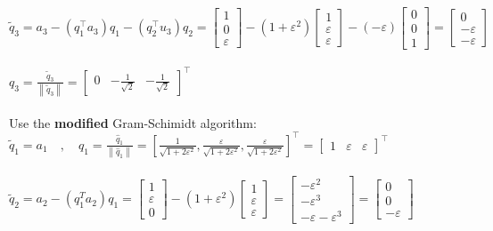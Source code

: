 \documentclass[english,onecolumn]{IEEEtran}
\begin{document}
\begin{enumerate}
\\$\tilde{q}_{3}=a_{3}-\left(q_{1}^{\top} a_{3}\right) q_{1}-\left(q_{2}^{\top} u_{3}\right) q_{2}=\left[\begin{array}{c}1 \\ 0 \\ \varepsilon\end{array}\right]-\left(1+\varepsilon^{2}\right)\left[\begin{array}{c}1 \\ \varepsilon \\ \varepsilon\end{array}\right]-(-\varepsilon)\left[\begin{array}{c}0 \\ 0 \\ 1\end{array}\right]=\left[\begin{array}{c}0 \\ -\varepsilon \\ -\varepsilon\end{array}\right]$
\\ \\$q_{3}=\frac{\tilde{q}_{3}}{\left\|\tilde{q}_{3}\right\|}=\left[\begin{array}{ccc}0 & -\frac{1}{\sqrt{2}} & -\frac{1}{\sqrt{2}}\end{array}\right]^{\top}$\\\\
Use the \textbf{modified} Gram-Schimidt algorithm: \\
$\tilde{q}_{1}=a_{1} \quad, \quad q_{1}=\frac{\hat{q}_{1}}{\left\|\hat{q}_{1}\right\|}=\left[\frac{1}{\sqrt{1+2 \varepsilon^{2}}}, \frac{\varepsilon}{\sqrt{1+2 \varepsilon^{2}}}, \frac{\varepsilon}{\sqrt{1+2 \varepsilon^{2}}}\right]^{\top}=\left[\begin{array}{lll}1 & \varepsilon & \varepsilon\end{array}\right]^{\top}$\\ \\
$\tilde{q}_{2}=a_{2}-\left(q_{1}^{T} a_{2}\right) q_{1}=\left[\begin{array}{c}1 \\ \varepsilon \\ 0\end{array}\right]-\left(1+\varepsilon^{2}\right)\left[\begin{array}{c}1 \\ \varepsilon \\ \varepsilon\end{array}\right]=\left[\begin{array}{c}-\varepsilon^{2} \\ -\varepsilon^{3} \\ -\varepsilon-\varepsilon^{3}\end{array}\right]=\left[\begin{array}{c}0 \\ 0 \\ -\varepsilon\end{array}\right]$\\

\end{enumerate}
\end{document}
